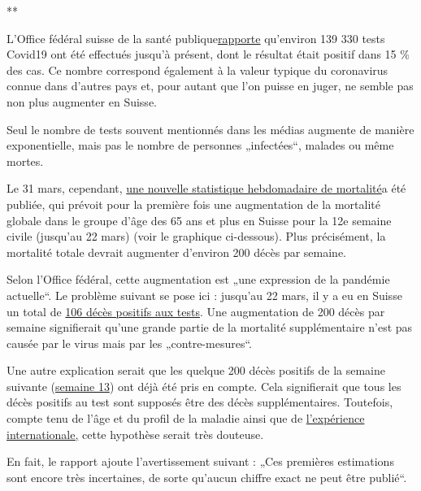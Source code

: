 **

L'Office fédéral suisse de la santé
publique\href{https://www.bag.admin.ch/bag/de/home/krankheiten/ausbrueche-epidemien-pandemien/aktuelle-ausbrueche-epidemien/novel-cov/situation-schweiz-und-international.html}{rapporte}
qu'environ 139 330 tests Covid19 ont été effectués jusqu'à présent, dont
le résultat était positif dans 15 \% des cas. Ce nombre correspond
également à la valeur typique du coronavirus connue dans d'autres pays
et, pour autant que l'on puisse en juger, ne semble pas non plus
augmenter en Suisse.

Seul le nombre de tests souvent mentionnés dans les médias augmente de
manière exponentielle, mais pas le nombre de personnes „infectées``,
malades ou même mortes.

Le 31 mars, cependant,
\href{https://www.bfs.admin.ch/bfs/de/home/statistiken/gesundheit/gesundheitszustand/sterblichkeit-todesursachen.html}{une
nouvelle statistique hebdomadaire de mortalité}a été publiée, qui
prévoit pour la première fois une augmentation de la mortalité globale
dans le groupe d'âge des 65 ans et plus en Suisse pour la 12e semaine
civile (jusqu'au 22 mars) (voir le graphique ci-dessous). Plus
précisément, la mortalité totale devrait augmenter d'environ 200 décès
par semaine.

Selon l'Office fédéral, cette augmentation est „une expression de la
pandémie actuelle``. Le problème suivant se pose ici : jusqu'au 22 mars,
il y a eu en Suisse un total de
\href{https://de.wikipedia.org/wiki/COVID-19-Pandemie_in_der_Schweiz\#Todesf\%C3\%A4lle}{106
décès positifs aux tests}. Une augmentation de 200 décès par semaine
signifierait qu'une grande partie de la mortalité supplémentaire n'est
pas causée par le virus mais par les „contre-mesures``.

Une autre explication serait que les quelque 200 décès positifs de la
semaine suivante
(\href{https://de.wikipedia.org/wiki/COVID-19-Pandemie_in_der_Schweiz\#Todesf\%C3\%A4lle}{semaine
13}) ont déjà été pris en compte. Cela signifierait que tous les décès
positifs au test sont supposés être des décès supplémentaires.
Toutefois, compte tenu de l'âge et du profil de la maladie ainsi que de
\href{https://swprs.org/rki-relativiert-corona-todesfaelle/}{l'expérience
internationale,} cette hypothèse serait très douteuse.

En fait, le rapport ajoute l'avertissement suivant : „Ces premières
estimations sont encore très incertaines, de sorte qu'aucun chiffre
exact ne peut être publié``.

